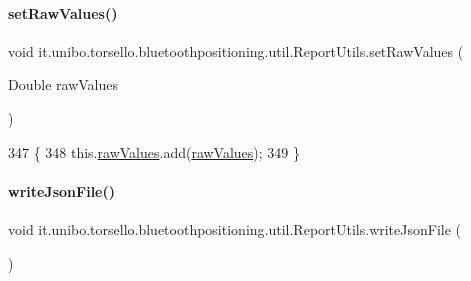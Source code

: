 \paragraph{\texorpdfstring{set\+Raw\+Values()}{setRawValues()}}
{\footnotesize\ttfamily void it.\+unibo.\+torsello.\+bluetoothpositioning.\+util.\+Report\+Utils.\+set\+Raw\+Values (\begin{DoxyParamCaption}\item[{Double}]{raw\+Values }\end{DoxyParamCaption})}


\begin{DoxyCode}
347                                                \{
348         this.\hyperlink{classit_1_1unibo_1_1torsello_1_1bluetoothpositioning_1_1util_1_1ReportUtils_adbe56bea0813a48932ef94b8b27c3314_adbe56bea0813a48932ef94b8b27c3314}{rawValues}.add(\hyperlink{classit_1_1unibo_1_1torsello_1_1bluetoothpositioning_1_1util_1_1ReportUtils_adbe56bea0813a48932ef94b8b27c3314_adbe56bea0813a48932ef94b8b27c3314}{rawValues});
349     \}
\end{DoxyCode}
\hypertarget{classit_1_1unibo_1_1torsello_1_1bluetoothpositioning_1_1util_1_1ReportUtils_aa14b78ad82095e13e057308f4b5da594_aa14b78ad82095e13e057308f4b5da594}{}\label{classit_1_1unibo_1_1torsello_1_1bluetoothpositioning_1_1util_1_1ReportUtils_aa14b78ad82095e13e057308f4b5da594_aa14b78ad82095e13e057308f4b5da594} 
\paragraph{\texorpdfstring{write\+Json\+File()}{writeJsonFile()}}
{\footnotesize\ttfamily void it.\+unibo.\+torsello.\+bluetoothpositioning.\+util.\+Report\+Utils.\+write\+Json\+File (\begin{DoxyParamCaption}{ }\end{DoxyParamCaption})\hspace{0.3cm}{\ttfamily [private]}}



